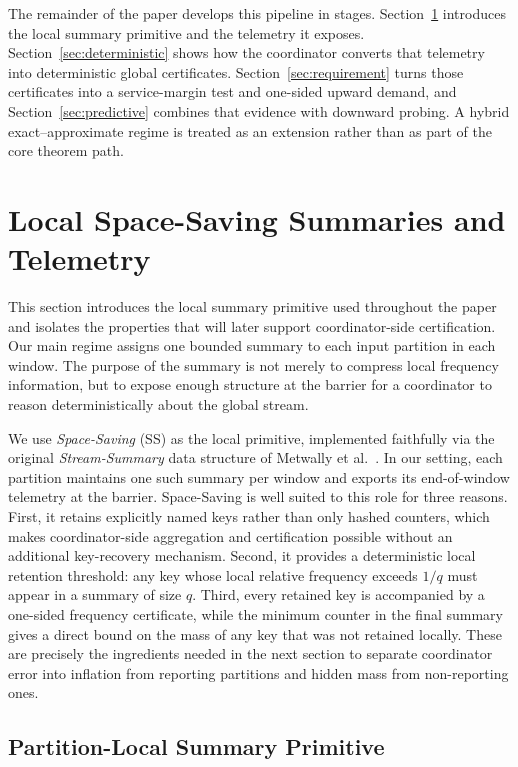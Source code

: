 \documentclass[sigconf, nonacm]{acmart}
\begin{document}
The remainder of the paper develops this pipeline in stages. Section~\ref{sec:ss-prelim} introduces the local summary primitive and the telemetry it exposes. Section~\ref{sec:deterministic} shows how the coordinator converts that telemetry into deterministic global certificates. Section~\ref{sec:requirement} turns those certificates into a service-margin test and one-sided upward demand, and Section~\ref{sec:predictive} combines that evidence with downward probing. A hybrid exact--approximate regime is treated as an extension rather than as part of the core theorem path.

\section{Local Space-Saving Summaries and Telemetry}
\label{sec:ss-prelim}

This section introduces the local summary primitive used throughout the paper and isolates the properties that will later support coordinator-side certification. Our main regime assigns one bounded summary to each input partition in each window. The purpose of the summary is not merely to compress local frequency information, but to expose enough structure at the barrier for a coordinator to reason deterministically about the global stream.


We use \emph{Space-Saving} (SS) as the local primitive, implemented faithfully via the original \emph{Stream-Summary} data structure of Metwally et al.~\cite{metwally2005efficient}. In our setting, each partition maintains one such summary per window and exports its end-of-window telemetry at the barrier. Space-Saving is well suited to this role for three reasons. First, it retains explicitly named keys rather than only hashed counters, which makes coordinator-side aggregation and certification possible without an additional key-recovery mechanism. Second, it provides a deterministic local retention threshold: any key whose local relative frequency exceeds \(1/q\) must appear in a summary of size \(q\). Third, every retained key is accompanied by a one-sided frequency certificate, while the minimum counter in the final summary gives a direct bound on the mass of any key that was not retained locally. These are precisely the ingredients needed in the next section to separate coordinator error into inflation from reporting partitions and hidden mass from non-reporting ones.

\subsection{Partition-Local Summary Primitive}
\label{subsec:ss-algorithm}
\end{document}
